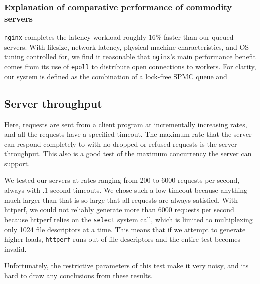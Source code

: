 \documentclass[twoside,10pt]{article}
\begin{document}
\begin{multicols}{2}
\subsubsection{Explanation of comparative performance of commodity
   servers}

\verb+nginx+ completes the latency workload roughly 16\% faster than
our queued servers. With filesize, network latency, physical machine
characteristics, and OS tuning controlled for, we find it reasonable
that \verb+nginx+'s main performance benefit comes from its use of
\verb+epoll+ to distribute open connections to workers. For clarity,
our system is defined as the combination of a lock-free SPMC queue and


\subsection{Server throughput}
Here, requests are sent from a client program at incrementally
increasing rates, and all the requests have a specified
timeout. The maximum rate that the server can respond completely to
with no dropped or refused requests is the server throughput. This
also is a good test of the maximum concurrency the server can support.

We tested our servers at rates ranging from 200 to 6000 requests per
second, always with .1 second timeouts. We chose such a low timeout
because anything much larger than that is so large that all requests
are always satisfied. With httperf, we could not reliably generate
more than 6000 requests per second because httperf relies on the
\verb+select+ system call, which is limited to multiplexing only 1024
file descriptors at a time. This means that if we attempt to generate
higher loads, \verb+httperf+ runs out of file descriptors and the
entire test becomes invalid.

Unfortunately, the restrictive parameters of this test make it very noisy, 
and its hard to draw any conclusions from these results. 



\end{multicols}
\end{document}
